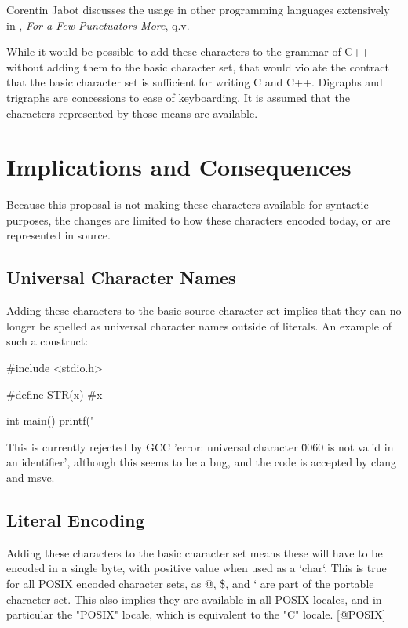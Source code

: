 \documentclass[a4paper,10pt,oneside,openany,final,article]{memoir}
\begin{document}
  Corentin Jabot discusses the usage in other programming languages extensively in \cite{@P2342R0}, \textit{For a Few Punctuators More}, q.v.

  While it would be possible to add these characters to the grammar of C++ without adding them to the basic character set, that would violate the contract that the basic character set is sufficient for writing C and C++. Digraphs and trigraphs are concessions to ease of keyboarding. It is assumed that the characters represented by those means are available.


\chapter{Implications and Consequences}

Because this proposal is not making these characters available for syntactic purposes, the changes are limited to how these characters encoded today, or are represented in source.

\section{Universal Character Names}

Adding these characters to the basic source character set implies that they can no longer be spelled as universal character names outside of literals. An example of such a construct:
\begin{codeblock}
#include <stdio.h>

#define STR(x) #x

int main()
{
  printf("%
}
\end{codeblock}

This is currently rejected by GCC 'error: universal character \u0060 is not valid in an identifier', although this seems to be a bug, and the code is accepted by clang and msvc.

\section{Literal Encoding}
Adding these characters to the basic character set means these will have to be encoded in a single byte, with positive value when used as a `char`. This is true for all POSIX encoded character sets, as @, \$, and ` are part of the portable character set. This also implies they are available in all POSIX locales, and in particular the "POSIX" locale, which is equivalent to the "C" locale. [@POSIX]
\end{document}
